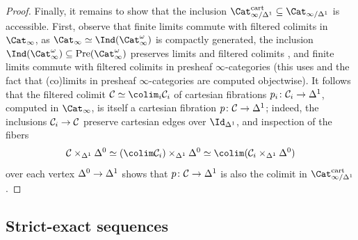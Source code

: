 \documentclass{amsart}
\renewcommand{\to}{\mathchoice{\longrightarrow}{\rightarrow}{\rightarrow}{\rightarrow}}
\let\catsymbfont\mathcal
\newcommand{\C}{\catsymbfont{C}}
\newcommand{\Pre}{\mathrm{Pre}}
\renewcommand{\i}{\infty}
\numberwithin{equation}{section}
\theoremstyle{definition}
\begin{document}
\begin{proof}
Finally, it remains to show that the inclusion
$\Cat_{\i/\Delta^1}^\mathrm{cart}\subseteq\Cat_{\i/\Delta^1}$ is
accessible.  First, observe that finite limits commute with filtered colimits in $\Cat_\i$, as $\Cat_\i\simeq\Ind(\Cat_\i^\omega)$ is compactly generated, the inclusion $\Ind(\Cat_\i^\omega)\subseteq\Pre(\Cat_\i^\omega)$ preserves limits and filtered colimits \cite[5.3.5.3]{HTT}, and finite limits commute with filtered colimits in presheaf $\i$-categories (this uses \cite[5.3.3.3]{HTT} and the fact that (co)limits in presheaf $\i$-categories are computed objectwise). It follows that the filtered colimit $\C\simeq\colim_i\C_i$ of cartesian fibrations
$p_i\colon\C_i\to\Delta^1$, computed in $\Cat_\i$, is itself a
cartesian fibration $p\colon\C\to\Delta^1$; indeed, the inclusions
$\C_i\to\C$ preserve cartesian edges over $\Id_{\Delta^1}$, and
inspection of the fibers 
\[
\C\times_{\Delta^1}\Delta^0\simeq(\colim\C_i)\times_{\Delta^1}\Delta^0\simeq\colim(\C_i\times_{\Delta^1}\Delta^0)
\]
over each vertex $\Delta^0\to\Delta^1$ shows that $p\colon \C\to\Delta^1$ is also the colimit in $\Cat_{\i/\Delta^1}^\mathrm{cart}$. 
\end{proof}

\subsection{Strict-exact sequences}\label{sec:strict}
\end{document}
